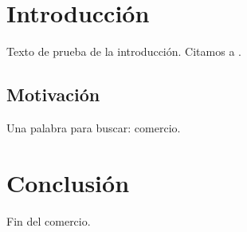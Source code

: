 \documentclass[11pt]{article}
\begin{document}
\section{Introducción}
Texto de prueba de la introducción. Citamos a \cite{melitz2003}.

\subsection{Motivación}
Una palabra para buscar: comercio.



\section{Conclusión}
Fin del comercio. \comandoQueNoExiste



\end{document}
